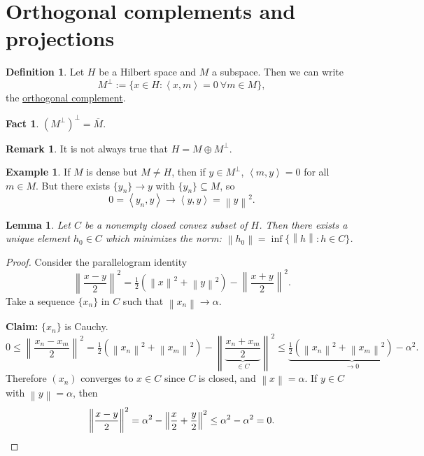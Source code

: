 \documentclass[12pt]{article}
\newcommand{\norm}[1]{\left\| #1 \right\|}
\newcommand{\ip}[2]{\left\langle #1, #2 \right\rangle}
\newtheorem{lma}[thm]{Lemma}
\theoremstyle{definition}
\newtheorem{defn}[thm]{Definition}
\newtheorem{ex}[thm]{Example}
\newtheorem{rmk}[thm]{Remark}
\newtheorem{fct}[thm]{Fact}
\begin{document}
\section{Orthogonal complements and projections}

\begin{defn}
	Let $H$ be a Hilbert space and $M$ a subspace.
	Then we can write
	\begin{equation*}
		M^\perp := \lbrace x \in H : \ip{x}{m} = 0 \ \forall m \in M \rbrace,
	\end{equation*}
	the \underline{orthogonal complement}.
\end{defn}

\begin{fct}
	$(M^\perp)^\perp = \overline{M}$.
\end{fct}

\begin{rmk}
	It is not always true that $H = M \oplus M^\perp$.
\end{rmk}

\begin{ex}
	If $M$ is dense but $M \neq H$, then if $y \in M^\perp$, $\ip{m}{y} = 0$ for all $m \in M$.
	But there exists $\lbrace y_n \rbrace \to y$ with $\lbrace y_n \rbrace \subseteq M$, so
	\begin{equation*}
		0 = \ip{y_n}{y} \to \ip{y}{y} = \norm{y}^2.
	\end{equation*}
\end{ex}

\begin{lma}
	Let $C$ be a nonempty closed convex subset of $H$.
	Then there exists a unique element $h_0 \in C$ which minimizes the norm: $\norm{h_0} = \inf \lbrace \norm{h} : h \in C \rbrace$.
\end{lma}
\begin{proof}
	Consider the parallelogram identity
	\begin{equation*}
		\norm{\frac{x-y}{2}}^2 = \tfrac{1}{2} \left( \norm{x}^2 + \norm{y}^2 \right) - \norm{\frac{x+y}{2}}^2.
	\end{equation*}
	Take a sequence $\lbrace x_n \rbrace$ in $C$ such that $\norm{x_n} \to \alpha$.

	\textbf{Claim: } $\lbrace x_n \rbrace$ is Cauchy.
	\begin{equation*}
		0 \leq \norm{\frac{x_n - x_m}{2}}^2 = \tfrac{1}{2} \left( \norm{x_n}^2 + \norm{x_m}^2 \right) - \norm{\underbrace{\frac{x_n + x_m}{2}}_{\in C}}^2 \leq \underbrace{\tfrac{1}{2} \left( \norm{x_n}^2 + \norm{x_m}^2 \right) - \alpha^2}_{\to 0}.
	\end{equation*}
	Therefore $(x_n)$ converges to $x \in C$ since $C$ is closed, and $\norm{x} = \alpha$.
	If $y \in C$ with $\norm{y} = \alpha$, then
	\begin{equation*}
		\norm{\frac{x-y}{2}}^2 = \alpha^2 - \norm{\frac{x}{2} + \frac{y}{2}}^2 \leq \alpha^2 - \alpha^2 = 0. \qedhere
	\end{equation*}
\end{proof}
\end{document}
